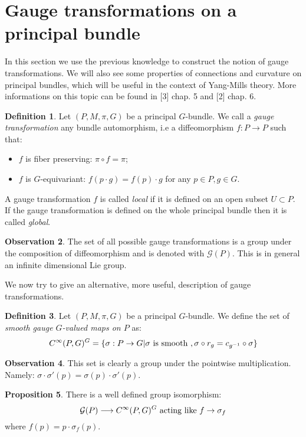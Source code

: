 \documentclass[12pt,a4paper]{report}
\theoremstyle{definition}
\newtheorem{Def}{Definition}[chapter]
\theoremstyle{Theorem}
\newtheorem{Prop}[Def]{Proposition}
\theoremstyle{definition}
\theoremstyle{definition}
\newtheorem{Obs}[Def]{Observation}
\begin{document}
	\section{Gauge transformations on a principal bundle}
	In this section we use the previous knowledge to construct the notion of gauge transformations. We will also see some properties of connections and curvature on principal bundles, which will be useful in the context of Yang-Mills theory. More informations on this topic can be found in [3] chap. 5 and [2] chap. 6.
	\begin{Def}
		Let $(P,M,\pi,G)$ be a principal $G$-bundle. We call a \textit{gauge transformation} any bundle automorphism, i.e a diffeomorphism $f:P\rightarrow P$ such that:
		\begin{itemize}
			\item $f$ is fiber preserving: $\pi\circ f=\pi$;
			\item $f$ is $G$-equivariant: $f(p\cdot g)=f(p)\cdot g$ for any $p\in P, g\in G$.
		\end{itemize}
		A gauge transformation $f$ is called \textit{local} if it is defined on an open subset $U\subset P$. If the gauge transformation is defined on the whole principal bundle then it is called \textit{global}.
	\end{Def}
	\begin{Obs}
		The set of all possible gauge transformations is a group under the composition of diffeomorphism and is denoted with $\mathcal{G}(P)$. This is in general an infinite dimensional Lie group.
	\end{Obs}
	We now try to give an alternative, more useful, description of gauge transformations.
	\begin{Def}
		Let $(P,M,\pi,G)$ be a principal $G$-bundle. We define the set of \textit{smooth gauge $G$-valued maps on $P$} as:
		$$C^\infty(P,G)^G=\{\sigma:P\rightarrow G|\sigma\hbox{ is smooth },\sigma\circ r_g=c_{g^{-1}}\circ \sigma\}$$
	\end{Def}
	\begin{Obs}
		This set is clearly a group under the pointwise multiplication. Namely:
		$\sigma\cdot \sigma'(p)=\sigma(p)\cdot \sigma'(p)$.
	\end{Obs}
	\begin{Prop}
		There is a well defined group isomorphism:
		$$\mathcal{G}(P)\longrightarrow C^\infty(P,G)^G\hbox{ acting like }f\rightarrow \sigma_f$$
		where $f(p)=p\cdot \sigma_f(p)$.
	\end{Prop}
\end{document}

